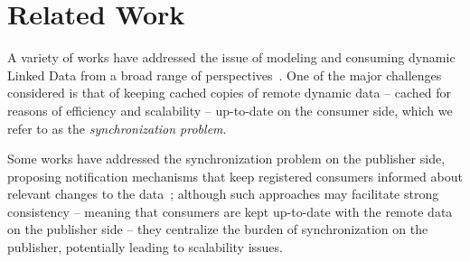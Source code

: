 \documentclass[runningheads]{llncs}
\begin{document}

%
\section{Related Work}
\label{sec:related}
%

A variety of works have addressed the issue of modeling and consuming dynamic Linked Data from a broad range of perspectives~\cite{PassantM10,TrampFEA10,UmbrichHHPD10,UmbrichKL10,KaferAUOH13,DividinoSGG13,IbanezSMC14,DividinoKG14,Kjernsmo15,NishiokaS16,GonzalezH18}. One of the major challenges considered is that of keeping cached copies of remote dynamic data -- cached for reasons of efficiency and scalability -- up-to-date on the consumer side, which we refer to as the \textit{synchronization problem}.

Some works have addressed the synchronization problem on the publisher side, proposing notification mechanisms that keep registered consumers informed about relevant changes to the data~\cite{MissierACDG07,PassantM10,TrampFEA10,MaderMS14,IbanezSMC14,webSub18}; although such approaches may facilitate strong consistency -- meaning that consumers are kept up-to-date with the remote data on the publisher side -- they centralize the burden  of synchronization on the publisher, potentially leading to scalability issues. 
\end{document}
